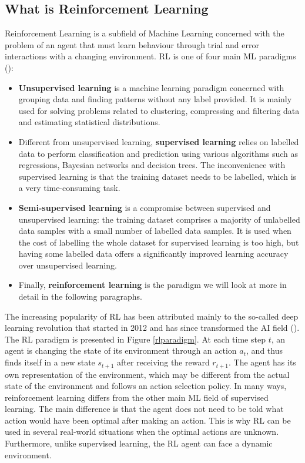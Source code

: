 \subsection{What is Reinforcement Learning}
Reinforcement Learning is a subfield of Machine Learning concerned with the problem of an agent that must learn behaviour through trial and error interactions with a changing environment. RL is one of four main ML paradigms (\cite{Alloghani2020}):
\begin{itemize}
	\item \textbf{Unsupervised learning} is a machine learning paradigm concerned with grouping data and finding patterns without any label provided. It is mainly used for solving problems related to clustering, compressing and filtering data and estimating statistical distributions.
	\item Different from unsupervised learning, \textbf{supervised learning} relies on labelled data to perform classification and prediction using various algorithms such as regressions, Bayesian networks and decision trees. The inconvenience with supervised learning is that the training dataset needs to be labelled, which is a very time-consuming task.
	\item \textbf{Semi-supervised learning} is a compromise between supervised and unsupervised learning: the training dataset comprises a majority of unlabelled data samples with a small number of labelled data samples. It is used when the cost of labelling the whole dataset for supervised learning is too high, but having some labelled data offers a significantly improved learning accuracy over unsupervised learning.
	\item Finally, \textbf{reinforcement learning} is the paradigm we will look at more in detail in the following paragraphs.
\end{itemize}


The increasing popularity of RL has been attributed mainly to the so-called deep learning revolution that started in 2012 and has since transformed the AI field (\cite{sejnowski2018deep}). \newline
The RL paradigm is presented in Figure \ref{rlparadigm}. At each time step $t$, an agent is changing the state of its environment through an action $a_t$, and thus finds itself in a new state $s_{t+1}$ after receiving the reward $r_{t+1}$. The agent has its own representation of the environment, which may be different from the actual state of the environment and follows an action selection policy. \newline
In many ways, reinforcement learning differs from the other main ML field of supervised learning. The main difference is that the agent does not need to be told what action would have been optimal after making an action. This is why RL can be used in several real-world situations when the optimal actions are unknown. Furthermore, unlike supervised learning, the RL agent can face a dynamic environment. 


